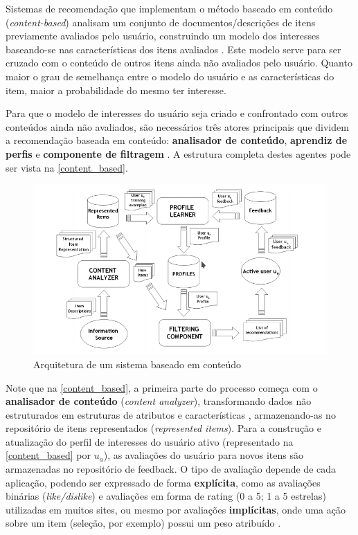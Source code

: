 \documentclass[12pt, openright, oneside, a4paper, brazil]{abntex2}
\begin{document}
Sistemas de recomendação que implementam o método baseado em conteúdo (\textit{content-based}) analisam um conjunto de documentos/descrições de itens previamente avaliados pelo usuário, construindo um modelo dos interesses baseando-se nas características dos itens avaliados \cite{mladenic1999text, adomavicius2005toward, lops2011content}. Este modelo serve para ser cruzado com o conteúdo de outros itens ainda não avaliados pelo usuário. Quanto maior o grau de semelhança entre o modelo do usuário e as características do item, maior a probabilidade do mesmo ter interesse.

Para que o modelo de interesses do usuário seja criado e confrontado com outros conteúdos ainda não avaliados, são necessários três atores principais que dividem a recomendação baseada em conteúdo: \textbf{analisador de conteúdo}, \textbf{aprendiz de perfis} e \textbf{componente de filtragem} \cite{lops2011content}. A estrutura completa destes agentes pode ser vista na \autoref{content_based}.

\begin{figure}[h!tp]
	\caption{\label{content_based}Arquitetura de um sistema baseado em conteúdo}

	\begin{center}
		\includegraphics[scale=0.8]{images/content_based.png}
	\end{center}

\end{figure}

Note que na \autoref{content_based}, a primeira parte do processo começa com o \textbf{analisador de conteúdo} (\textit{content analyzer}), transformando dados não estruturados em estruturas de atributos e características \cite{lops2011content, mladenic1999text}, armazenando-as no repositório de itens representados (\textit{represented items}). Para a construção e atualização do perfil de interesses do usuário ativo (representado na \autoref{content_based} por $u_{a}$), as avaliações do usuário para novos itens são armazenadas no repositório de feedback. O tipo de avaliação depende de cada aplicação, podendo ser expressado de forma \textbf{explícita}, como as avaliações binárias (\textit{like/dislike}) e avaliações em forma de rating (0 a 5; 1 a 5 estrelas) utilizadas em muitos sites, ou mesmo por avaliações \textbf{implícitas}, onde uma ação sobre um item (seleção, por exemplo) possui um peso atribuído \cite{pazzani2007content}.
\end{document}
